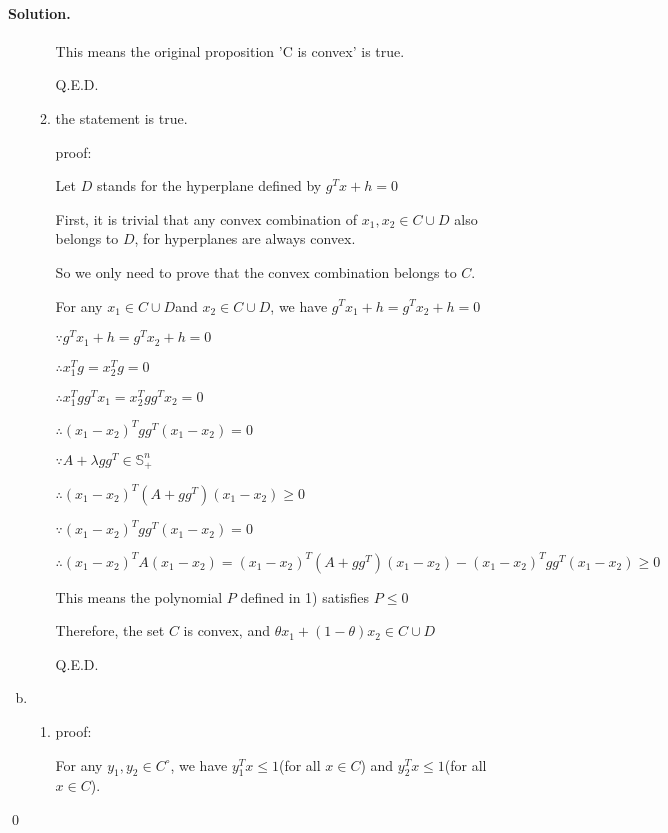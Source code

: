 \documentclass[a4paper]{article}
\newenvironment{solution}
{\color{blue} \paragraph{Solution.}}
{\newline \qed}
\begin{document}
\begin{solution}
\begin{enumerate}[a)]
\begin{enumerate}[1)]
                This means the original proposition 'C is convex' is true.

                Q.E.D.

                \item the statement is true. 
                
                proof:

                Let $D$ stands for the hyperplane defined by $g^Tx+h=0$

                First, it is trivial that any convex combination of $x_1, x_2\in C\cup D$ also belongs to $D$, for hyperplanes are always convex.

                So we only need to prove that the convex combination belongs to $C$.
                
                For any $x_1\in C\cup D $and $x_2\in C\cup D$, we have $g^Tx_1+h=g^Tx_2+h=0$

                $\because g^Tx_1+h=g^Tx_2+h=0$

                $\therefore x_1^Tg=x_2^Tg=0$

                $\therefore x_1^Tgg^Tx_1=x_2^Tgg^Tx_2=0$

                $\therefore (x_1-x_2)^Tgg^T(x_1-x_2)=0$

                $\because A+\lambda gg^T\in \mathbb{S}_+^n$

                $\therefore (x_1-x_2)^T(A+gg^T)(x_1-x_2)\geq 0$

                $\because (x_1-x_2)^Tgg^T(x_1-x_2)=0$

                $\therefore (x_1-x_2)^TA(x_1-x_2)=(x_1-x_2)^T(A+gg^T)(x_1-x_2)-(x_1-x_2)^Tgg^T(x_1-x_2)\geq 0$

                This means the polynomial $P$ defined in 1) satisfies $P\leq 0$

                Therefore, the set $C$ is convex, and $\theta x_1+(1-\theta)x_2\in C \cup D$

                Q.E.D.
                
            \end{enumerate}

        \item 
            \begin{enumerate}[1)]
                \item proof:
                
                For any $y_1, y_2\in C^\circ$, we have $y_1^Tx\leq 1$(for all $x\in C$) and $y_2^Tx\leq 1$(for all $x\in C$).


\end{enumerate}
\end{enumerate}
\end{solution}
\end{document}
